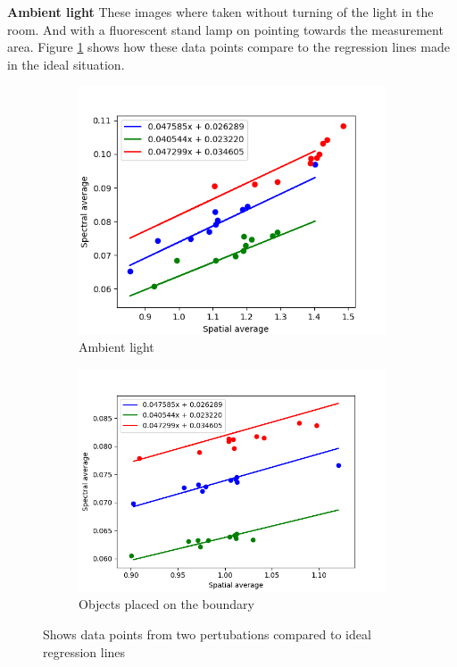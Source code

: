 \textbf{Ambient light}
These images where taken without turning of the light in the room. And with a fluorescent stand lamp on pointing towards the measurement area. Figure \ref{fig:ambient_light_plot} shows how these data points compare to the regression lines made in the ideal situation.

\begin{figure}[H]
    \begin{subfigure}{0.5\textwidth}
        \centering
        \includegraphics[width=0.9\linewidth]{Plots/spectral_vs_spatial_average_with_regression_ambient_light.png}
        \caption{Ambient light}
        \label{fig:ambient_light_plot}
    \end{subfigure}%
    \begin{subfigure}{0.5\textwidth}
        \centering
        \includegraphics[width=0.9\linewidth]{Plots/spectral_vs_spatial_average_with_regression_boundary_objects.png}
        \caption{Objects placed on the boundary}
        \label{fig:boundary_objects_plot}
    \end{subfigure}
    \caption{Shows data points from two pertubations compared to ideal regression lines}
\end{figure}


